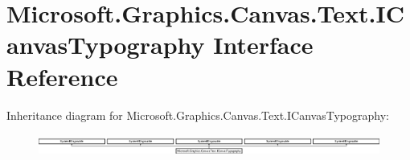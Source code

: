 \hypertarget{interface_microsoft_1_1_graphics_1_1_canvas_1_1_text_1_1_i_canvas_typography}{}\section{Microsoft.\+Graphics.\+Canvas.\+Text.\+I\+Canvas\+Typography Interface Reference}
\label{interface_microsoft_1_1_graphics_1_1_canvas_1_1_text_1_1_i_canvas_typography}
Inheritance diagram for Microsoft.\+Graphics.\+Canvas.\+Text.\+I\+Canvas\+Typography\+:\begin{figure}[H]
\begin{center}
\leavevmode
\includegraphics[height=0.700000cm]{interface_microsoft_1_1_graphics_1_1_canvas_1_1_text_1_1_i_canvas_typography}
\end{center}
\end{figure}
